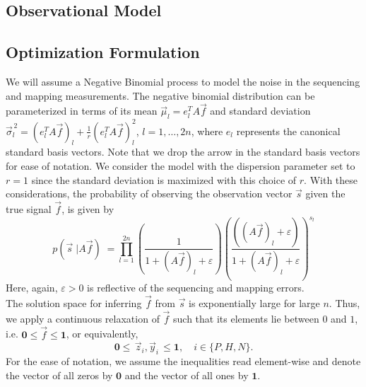 	\subsection{Observational Model}
	

\subsection{Optimization Formulation}
We will assume a Negative Binomial process to model the noise in the sequencing and mapping measurements. The negative binomial distribution can be parameterized in terms of its mean $\vec{\mu}_l = e_{l}^{T} A \vec{f}$ and standard deviation $\vec{\sigma}_{l}^{\,2} = (e_{l}^{T} A \vec{f})_{l} + \frac{1}{r} (e_{l}^{T} A \vec{f})_{l}^{2} $, $l=1, \dots, 2n$, where $e_l$ represents the canonical standard basis vectors. Note that we drop the arrow in the standard basis vectors for ease of notation. We consider the model with the dispersion parameter set to $r =1$ since the standard deviation is maximized with this choice of $r$. With these considerations, the probability of observing the observation vector $\vec{s}$ given the true signal $\vec{f}$, is given by 
\begin{equation} \label{negBinModel_probability}
	p(\vec{s} \; | A\vec{f})\; = \prod_{l=1}^{2n} \left( \frac{1}{1+ (A \vec{f})_l + \varepsilon} \right) \left(  \frac{((A \vec{f})_l + \varepsilon)}{1+ (A \vec{f})_l + \varepsilon} \right)^{s_l} 
\end{equation}
Here, again,  $\varepsilon>0$ is reflective of the sequencing and mapping errors. \\

The solution space for inferring $\vec{f}$ from $\vec{s}$ is exponentially large for large $n$. Thus, we apply a continuous relaxation  of $\vec{f}$ such that its elements lie between $0$ and $1$, i.e. $\mathbf{0} \leq \vec{f} \leq \mathbf{1}$, or equivalently,
\begin{equation}
	\mathbf{0} \leq \, \vec{z}_i, \vec{y}_i \, \leq \mathbf{1}, \quad i \in \{P,H,N\}.
\end{equation}
For the ease of notation, we assume the inequalities read element-wise and denote the vector of all zeros by $\mathbf{0}$ and the vector of all ones by $\mathbf{1}$. \\

